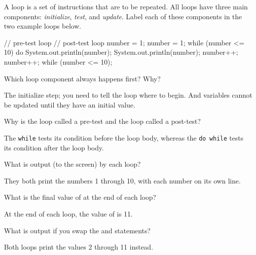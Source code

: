 
A loop is a set of instructions that are to be repeated.
All loops have three main components: \emph{initialize}, \emph{test}, and \emph{update}.
Label each of these components in the two example loops below.

\vspace{1ex}
\begin{javalst}
    // pre-test loop                         // post-test loop
    number = 1;                              number = 1;
    while (number <= 10) {                   do {
        System.out.println(number);              System.out.println(number);
        number++;                                number++;
    }                                        } while (number <= 10);
\end{javalst}




\Q Which loop component always happens first? Why?

\begin{answer}
The initialize step; you need to tell the loop where to begin.
And variables cannot be updated until they have an initial value.
\end{answer}


\Q Why is the  loop called a pre-test and the  loop called a post-test?

\begin{answer}
The \texttt{while} tests its condition before the loop body, whereas the \texttt{do while} tests its condition after the loop body.
\end{answer}


\Q What is output (to the screen) by each loop?

\begin{answer}
They both print the numbers 1 through 10, with each number on its own line.
\end{answer}


\Q What is the final value of  at the end of each loop?

\begin{answer}
At the end of each loop, the value of  is 11.
\end{answer}


\Q What is output if you swap the  and  statements?

\begin{answer}
Both loops print the values 2 through 11 instead.
\end{answer}


